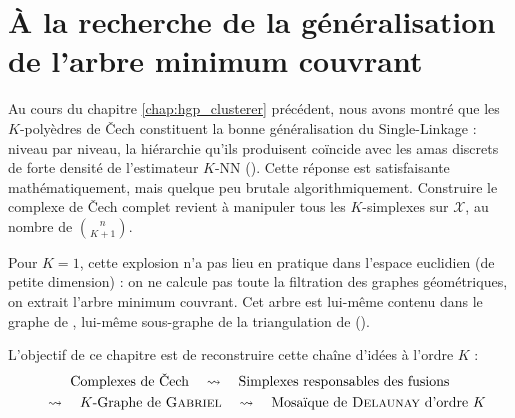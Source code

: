 \chapter{À la recherche de la généralisation de l'arbre minimum couvrant}
\label{chap:generalisation_mst}

Au cours du chapitre \ref{chap:hgp_clusterer} précédent, nous avons montré que les $K$-polyèdres de \v Cech constituent la bonne généralisation du Single-Linkage : niveau par niveau, la hiérarchie qu'ils produisent coïncide avec les amas discrets de forte densité de l'estimateur $K$-NN ().
Cette réponse est satisfaisante mathématiquement, mais quelque peu brutale algorithmiquement. Construire le complexe de \v Cech complet revient à manipuler tous les $K$-simplexes sur $\mathcal X$, au nombre de $\binom n{K+1}$.

Pour $K=1$, cette explosion n'a pas lieu en pratique dans l'espace euclidien (de petite dimension) : on ne calcule pas toute la filtration des graphes géométriques, on extrait l'arbre minimum couvrant. %
Cet arbre est lui-même contenu dans le graphe de , lui-même sous-graphe de la triangulation de  ().

L'objectif de ce chapitre est de reconstruire cette chaîne d'idées à l'ordre $K$ :
\begin{multline*}
    \text{Complexes de \v Cech} 
    \quad\leadsto\quad \text{Simplexes responsables des fusions} \\
    \quad\leadsto\quad \text{$K$-Graphe de }\nom{Gabriel}
    \quad\leadsto\quad \text{Mosaïque de \nom{Delaunay} d'ordre }K
\end{multline*}


